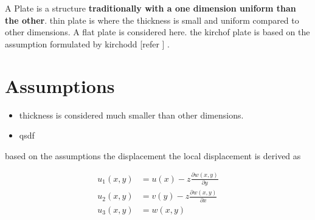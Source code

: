 \documentclass[main.tex]{subfiles}
\begin{document}
A Plate is a structure \textbf{traditionally with a one dimension uniform than the other}. thin plate is where the thickness is small and uniform compared to other dimensions. A flat plate is considered here. the kirchof plate is based on the assumption formulated by kirchodd [refer ] . 

\section{Assumptions}

\begin{itemize}
\item thickness is considered much smaller than other dimensions. 
\item qsdf
\end{itemize}


based on the assumptions the displacement the local displacement is derived as


\begin{align}
u_1 \left( x, y \right) & =  u \left( x \right) - z \frac{\partial w \left( x, y \right)}{\partial y}\\
u_2 \left( x, y \right) & =  v \left( y \right) - z \frac{\partial w \left( x, y \right)}{\partial x}\\
u_3 \left( x, y \right) & =  w \left(x, y \right) 
\end{align}









\end{document}
